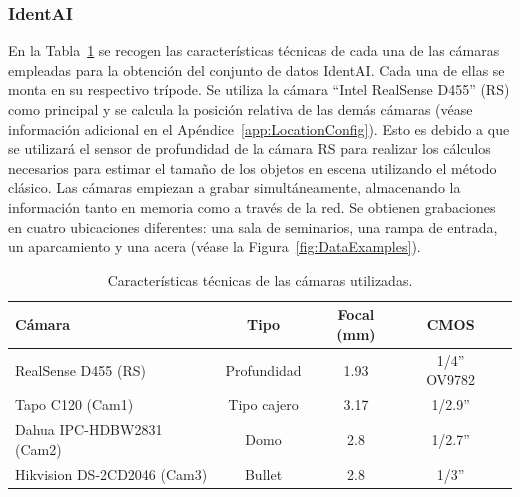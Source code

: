 \subsubsection{IdentAI}
En la Tabla~\ref{tab:CaptureSystem} se recogen las características técnicas de cada una de las cámaras
empleadas para la obtención del conjunto de datos IdentAI.
Cada una de ellas se monta en su respectivo trípode. Se utiliza la cámara ``Intel RealSense D455'' (RS) como principal y
se calcula la posición relativa de las demás cámaras (véase información adicional en el Apéndice~\ref{app:LocationConfig}).
Esto es debido a que se utilizará el sensor de profundidad de la cámara RS para realizar los cálculos necesarios para estimar el
tamaño de los objetos en escena utilizando el método clásico. Las cámaras empiezan a grabar simultáneamente, almacenando
la información tanto en memoria como a través de la red. Se obtienen grabaciones en cuatro ubicaciones diferentes: una sala de seminarios,
una rampa de entrada, un aparcamiento y una acera (véase la Figura~\ref{fig:DataExamples}).
\begin{table}[!htp]
\scriptsize
\centering
\begin{tabular}{|l|c|c|c|c|}
\hline
\rowcolor[HTML]{FFCB2F}
\textbf{Cámara} & \textbf{Tipo} & \textbf{Focal (mm)} & \textbf{CMOS} \\
\hline
RealSense D455 (RS) & Profundidad & 1.93 &  1/4'' OV9782 \\
\hline
Tapo C120 (Cam1) & Tipo cajero & 3.17 &  1/2.9'' \\
\hline
Dahua IPC-HDBW2831 (Cam2) & Domo & 2.8 &  1/2.7'' \\
\hline
Hikvision DS-2CD2046 (Cam3) & Bullet & 2.8 &  1/3'' \\
\hline
\end{tabular}
\caption{Características técnicas de las cámaras utilizadas.}
\label{tab:CaptureSystem}
\end{table}


